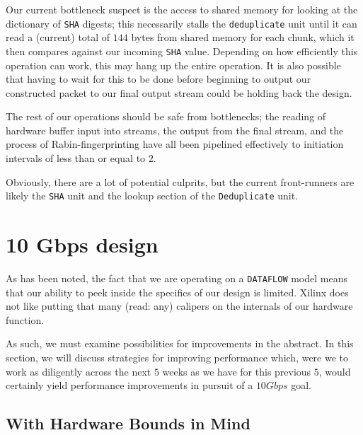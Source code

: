\documentclass{article}
\begin{document}
\par
Our current bottleneck suspect is the access to shared memory for looking at the dictionary of \texttt{SHA} digests; this necessarily stalls the \texttt{deduplicate} unit until it can read a (current) total of $144$ bytes from shared memory for each chunk, which it then compares against our incoming \texttt{SHA} value. Depending on how efficiently this operation can work, this may hang up the entire operation. It is also possible that having to wait for this to be done before beginning to output our constructed packet to our final output stream could be holding back the design.
\par
The rest of our operations should be safe from bottlenecks; the reading of hardware buffer input into streams, the output from the final stream, and the process of Rabin-fingerprinting have all been pipelined effectively to initiation intervals of less than or equal to $2$.
\newline\par
Obviously, there are a lot of potential culprits, but the current front-runners are likely the \texttt{SHA} unit and the lookup section of the \texttt{Deduplicate} unit.

\section{10 Gbps design}

As has been noted, the fact that we are operating on a \texttt{DATAFLOW} model means that our ability to peek inside the specifics of our design is limited. Xilinx does not like putting that many (read: any) calipers on the internals of our hardware function.
\par
As such, we must examine possibilities for improvements in the abstract. In this section, we will discuss strategies for improving performance which, were we to work as diligently across the next $5$ weeks as we have for this previous $5$, would certainly yield performance improvements in pursuit of a $10Gbps$ goal.

\subsection{With Hardware Bounds in Mind}
\end{document}
